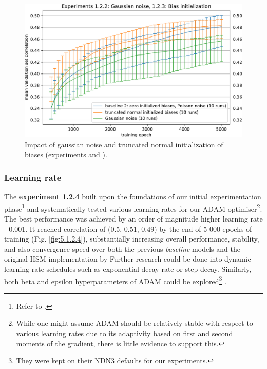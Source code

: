 \begin{figure}[H]
    \centering
    \includegraphics[width=1\textwidth]{../figures/05_1_2_2}
    \caption[Experiments 1.2.2 and 1.2.3]{Impact of gaussian noise and truncated normal initialization of biases (experiments  and ).}
    \label{fig:5.1.2.2}
\end{figure}

\subsubsection{Learning rate}\label{ex:1.2.4}

The \textbf{experiment 1.2.4} built upon the foundations of our initial experimentation phase\footnote{Refer to .} and systematically tested various learning rates for our ADAM optimiser\footnote{While one might assume ADAM should be relatively stable with respect to various learning rates due to its adaptivity based on first and second moments of the gradient, there is little evidence to support this.}. The best performance was achieved by an order of magnitude higher learning rate - 0.001. It reached correlation of (0.5, 0.51, 0.49) by the end of 5 000 epochs of training (Fig. \ref{fig:5.1.2.4}), substantially increasing overall performance, stability, and also convergence speed over both the previous \textit{baseline} models and the original HSM implementation by \citeauthor{antolik} Further research could be done into dynamic learning rate schedules such as exponential decay rate or step decay. Similarly, both beta and epsilon hyperparameters of ADAM could be explored\footnote{They were kept on their NDN3 defaults for our experiments.} \citep{2019arXiv191005446C}.


